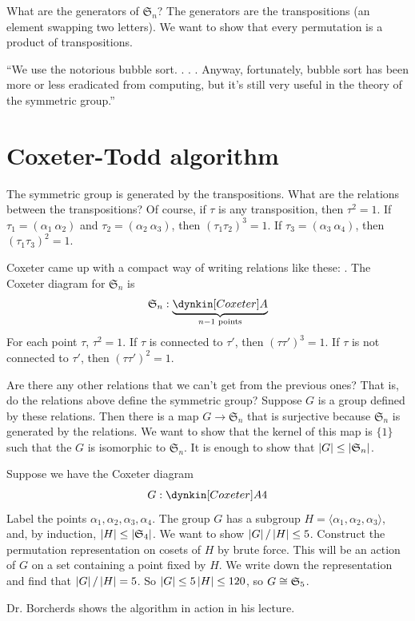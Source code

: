 \documentclass[11pt, twoside]{amsart}
\begin{document}
What are the generators of $\mathfrak{S}_n$? The generators are the transpositions (an element swapping two letters). We want to show that every permutation is a product of transpositions. 

``We use the notorious bubble sort. . . . Anyway, fortunately, bubble sort has been more or less eradicated from computing, but it's still very useful in the theory of the symmetric group.''

\section{Coxeter-Todd algorithm}
The symmetric group is generated by the transpositions. What are the relations between the transpositions? Of course, if $\tau$ is any transposition, then $\tau^2 = 1$. If $\tau_1 = (\alpha_1\  \alpha_2)$ and $\tau_2 = (\alpha_2\ \alpha_3)$, then $(\tau_1\tau_2)^3=1$. If $\tau_3 = (\alpha_3\ \alpha_4)$, then $(\tau_1\tau_3)^2=1$.

Coxeter came up with a compact way of writing relations like these: . The Coxeter diagram for $\mathfrak{S}_n$ is 
$$
\mathfrak{S}_n : \underbrace{\dynkin [Coxeter]A{}}_{n-1 \textrm{ points}}
$$
For each point $\tau$, $\tau^2=1$. If $\tau$ is connected to $\tau'$, then $(\tau\tau')^3 = 1$. If $\tau$ is not connected to $\tau'$, then $(\tau\tau')^2=1$.

Are there any other relations that we can't get from the previous ones? That is, do the relations above define the symmetric group? Suppose $G$ is a group defined by these relations. Then there is a map $G\longrightarrow \mathfrak{S}_n$ that is surjective because $\mathfrak{S}_n$ is generated by the relations. We want to show that the kernel of this map is $\{1\}$ such that the $G$ is isomorphic to $\mathfrak{S}_n$. It is enough to show that $\left \lvert G \right \rvert \le \left \lvert \mathfrak{S}_n \right \rvert$. 

Suppose we have the Coxeter diagram
$$
G : \dynkin [Coxeter]A{4}
$$
Label the points $\alpha_1,\alpha_2,\alpha_3,\alpha_4$. The group $G$ has a subgroup $H=\langle \alpha_1,\alpha_2,\alpha_3\rangle$, and, by induction, $\left \lvert H \right \rvert \le \left \lvert \mathfrak{S}_4 \right \rvert$. We want to show $\left \lvert G \right \rvert / \left \lvert H \right \rvert \le 5$. Construct the permutation representation on cosets of $H$ by brute force. This will be an action of $G$ on a set containing a point fixed by $H$. We write down the representation and find that $\left \lvert G \right \rvert / \left \lvert H \right \rvert = 5$. So $\left \lvert G \right \rvert \le 5\left \lvert H \right \rvert \le 120$, so $G\cong \mathfrak{S}_5$.

Dr. Borcherds shows the algorithm in action in his lecture.
\end{document}
